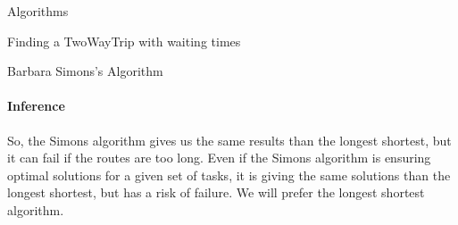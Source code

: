 \documentclass[a4paper,10pt]{report}
\begin{document}
\begin{chapter}{Algorithms}
\begin{section}{Finding a TwoWayTrip with waiting times}
\begin{subsection}{Barbara Simons's Algorithm}
\paragraph{Inference}
So, the Simons algorithm gives us the same results than the longest shortest, but it can fail if the routes are too long.
Even if the Simons algorithm is ensuring optimal solutions for a given set of tasks, it is giving the same solutions than the longest shortest, but
has a risk of failure. We will prefer the longest shortest algorithm.



\end{subsection}

\end{section}

\end{chapter}
\end{document}
